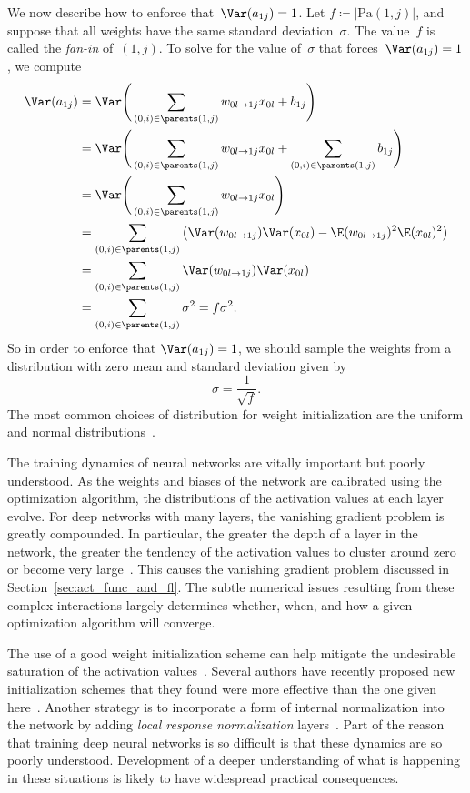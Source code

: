 \documentclass[11pt,a4paper]{article}
\numberwithin{equation}{section}
\newcommand{\weight}[2]{w_{#1 \rightarrow #2}}
\begin{document}
We now describe how to enforce that~$\Var(a_{1j}) = 1$. Let $f \coloneqq
|\text{Pa}(1, j)|$, and suppose that all weights have the same standard
deviation~$\sigma$. The value~$f$ is called the \emph{fan-in} of~$(1, j)$. To
solve for the value of~$\sigma$ that forces~$\Var(a_{1j}) = 1$, we compute
\begin{align*}
	\Var(a_{1j})
	&= \Var\Bigg(\sum_{(0, i) \in \parents(1, j)} \weight{0l}{1j} x_{0l} + b_{1j}\Bigg) \\
	&= \Var\Bigg(
		\sum_{(0, i) \in \parents(1, j)} \weight{0l}{1j} x_{0l} +
		\sum_{(0, i) \in \parents(1, j)} b_{1j}
	\Bigg) \\
	&= \Var\Bigg(\sum_{(0, i) \in \parents(1, j)} \weight{0l}{1j} x_{0l}\Bigg)\\
	&= \sum_{(0, i) \in \parents(1, j)} \left(
		\Var(\weight{0l}{1j}) \Var(x_{0l}) -
		\E(\weight{0l}{1j})^2 \E(x_{0l})^2
	\right) \\
	&= \sum_{(0, i) \in \parents(1, j)} \Var(\weight{0l}{1j}) \Var(x_{0l}) \\
	&= \sum_{(0, i) \in \parents(1, j)} \sigma^2 = f \sigma^2.
\end{align*}
So in order to enforce that $\Var(a_{1j}) = 1$, we should sample the weights
from a distribution with zero mean and standard deviation given by
\begin{equation}
	\sigma = \frac{1}{\sqrt{f}}.
	\label{eq:weight_stddev}
\end{equation}
The most common choices of distribution for weight initialization are the
uniform and normal distributions~\citep{lecun-98b, krizhevsky2012imagenet}.

The training dynamics of neural networks are vitally important but poorly
understood. As the weights and biases of the network are calibrated using the
optimization algorithm, the distributions of the activation values at each layer
evolve. For deep networks with many layers, the vanishing gradient problem is
greatly compounded. In particular, the greater the depth of a layer in the
network, the greater the tendency of the activation values to cluster around
zero or become very large~\citep{glorot2010understanding}. This causes the
vanishing gradient problem discussed in
Section~\ref{sec:act_func_and_fl}. The subtle numerical issues
resulting from these complex interactions largely determines whether, when, and
how a given optimization algorithm will converge.

The use of a good weight initialization scheme can help mitigate the undesirable
saturation of the activation values~\citep{glorot2010understanding}. Several
authors have recently proposed new initialization schemes that they found were
more effective than the one given here~\citep{glorot2010understanding,
martens2010deep}. Another strategy is to incorporate a form of internal
normalization into the network by adding \emph{local response normalization}
layers~\citep{krizhevsky2012imagenet}. Part of the reason that training deep
neural networks is so difficult is that these dynamics are so poorly understood.
Development of a deeper understanding of what is happening in these situations
is likely to have widespread practical consequences.
\end{document}
